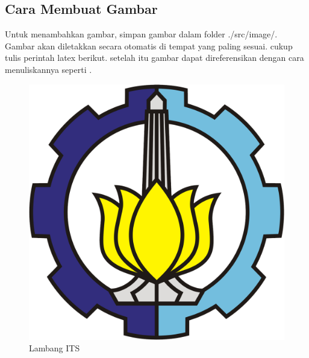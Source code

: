 \subsection{Cara Membuat Gambar}{
    Untuk menambahkan gambar, simpan gambar dalam folder ./src/image/. Gambar akan diletakkan secara otomatis di tempat yang paling sesuai. cukup tulis perintah latex berikut. setelah itu gambar dapat direferensikan dengan cara menuliskannya seperti .
    \begin{figure}
        \centering
        \includegraphics[width=.3\textwidth]{src/image/its-lambang.png}
        \caption{Lambang ITS}
        \label{fig: lambang its}
    \end{figure}

}
